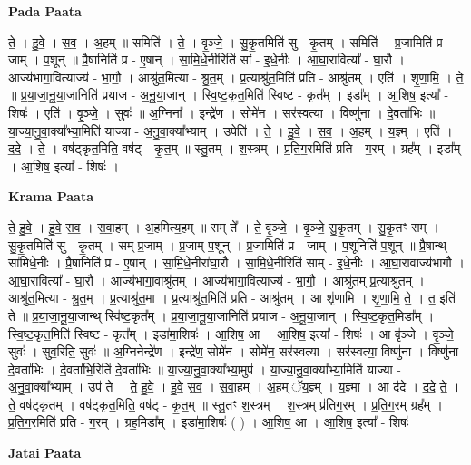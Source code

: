 \documentclass[17pt]{extarticle}
\begin{document}
\textbf{Pada Paata} \newline

ते॒ । हु॒वे॒ । स॒व॒ । अ॒हम् ॥ समिति॑ । ते॒ । वृ॒ञ्जे॒ । सु॒कृ॒तमिति॑ सु - कृ॒तम् । समिति॑ । प्र॒जामिति॑ प्र - जाम् । प॒शून् ॥ प्रै॒षानिति॑ प्र - ए॒षान् । सा॒मि॒धे॒नीरिति॑ सां - इ॒धे॒नीः । आ॒घा॒रावित्या᳚ - घा॒रौ । आज्य॑भागा॒वित्याज्य॑ - भा॒गौ॒ । आश्रु॑त॒मित्या - श्रु॒त॒म् । प्र॒त्याश्रु॑त॒मिति॑ प्रति - आश्रु॑तम् । एति॑ । शृ॒णा॒मि॒ । ते॒ ॥ प्र॒या॒जा॒नू॒या॒जानिति॑ प्रयाज - अ॒नू॒या॒जान् । स्वि॒ष्ट॒कृत॒मिति॑ स्विष्ट - कृत᳚म् । इडा᳚म् । आ॒शिष॒ इत्या᳚ - शिषः॑ । एति॑ । वृ॒ञ्जे॒ । सुवः॑ ॥ अ॒ग्निना᳚ । इन्द्रे॑ण । सोमे॑न । सर॑स्वत्या । विष्णु॑ना । दे॒वता॑भिः ॥ या॒ज्या॒नु॒वा॒क्या᳚भ्या॒मिति॑ याज्या - अ॒नु॒वा॒क्या᳚भ्याम् । उपेति॑ । ते॒ । हु॒वे॒ । स॒व॒ । अ॒हम् । य॒ज्ञ्म् । एति॑ । द॒दे॒ । ते॒ । वष॑ट्कृत॒मिति॒ वष॑ट् - कृ॒त॒म् ॥ स्तु॒तम् । श॒स्त्रम् । प्र॒ति॒ग॒रमिति॑ प्रति - ग॒रम् । ग्रह᳚म् । इडा᳚म् । आ॒शिष॒ इत्या᳚ - शिषः॑ ।  \newline


\textbf{Krama Paata} \newline

ते॒ हु॒वे॒ । हु॒वे॒ स॒व॒ । स॒वा॒हम् । अ॒हमित्य॒हम् ॥ सम् ते᳚ । ते॒ वृ॒ञ्जे॒ । वृ॒ञ्जे॒ सु॒कृ॒तम् । सु॒कृ॒तꣳ सम् । सु॒कृ॒तमिति॑ सु - कृ॒तम् । सम् प्र॒जाम् । प्र॒जाम् प॒शून् । प्र॒जामिति॑ प्र - जाम् । प॒शूनिति॑ प॒शून् ॥ प्रै॒षान्थ् सा॑मिधे॒नीः । प्रै॒षानिति॑ प्र - ए॒षान् । सा॒मि॒धे॒नीरा॑घा॒रौ । सा॒मि॒धे॒नीरिति॑ साम् - इ॒धे॒नीः । आ॒घा॒रावाज्य॑भागौ । आ॒घा॒रावित्या᳚ - घा॒रौ । आज्य॑भागा॒वाश्रु॑तम् । आज्य॑भागा॒वित्याज्य॑ - भा॒गौ॒ । आश्रु॑तम् प्र॒त्याश्रु॑तम् । आश्रु॑त॒मित्या - श्रु॒त॒म् । प्र॒त्याश्रु॑त॒मा । प्र॒त्याश्रु॑त॒मिति॑ प्रति - आश्रु॑तम् । आ शृ॑णामि । शृ॒णा॒मि॒ ते॒ । त॒ इति॑ ते ॥ प्र॒या॒जा॒नू॒या॒जान्थ् स्वि॑ष्ट॒कृत᳚म् । प्र॒या॒जा॒नू॒या॒जानिति॑ प्रयाज - अ॒नू॒या॒जान् । स्वि॒ष्ट॒कृत॒मिडा᳚म् । स्वि॒ष्ट॒कृत॒मिति॑ स्विष्ट - कृत᳚म् । इडा॑मा॒शिषः॑ । आ॒शिष॒ आ । आ॒शिष॒ इत्या᳚ - शिषः॑ । आ वृ॑ञ्जे । वृ॒ञ्जे॒ सुवः॑ । सुव॒रिति॒ सुवः॑ ॥ अ॒ग्निनेन्द्रे॑ण । इन्द्रे॑ण॒ सोमे॑न । सोमे॑न॒ सर॑स्वत्या । सर॑स्वत्या॒ विष्णु॑ना । विष्णु॑ना दे॒वता॑भिः । दे॒वता॑भि॒रिति॑ दे॒वता॑भिः ॥ या॒ज्या॒नु॒वा॒क्या᳚भ्या॒मुप॑ । या॒ज्या॒नु॒वा॒क्या᳚भ्या॒मिति॑ याज्या - अ॒नु॒वा॒क्या᳚भ्याम् । उप॑ ते । ते॒ हु॒वे॒ । हु॒वे॒ स॒व॒ । स॒वा॒हम् । अ॒हम् ॅय॒ज्ञ्म् । य॒ज्ञ्मा । आ द॑दे । द॒दे॒ ते॒ । ते॒ वष॑ट्कृतम् । वष॑ट्कृत॒मिति॒ वष॑ट् - कृ॒त॒म् ॥ स्तु॒तꣳ श॒स्त्रम् । श॒स्त्रम् प्र॑तिग॒रम् । प्र॒ति॒ग॒रम् ग्रह᳚म् । प्र॒ति॒ग॒रमिति॑ प्रति - ग॒रम् । ग्रह॒मिडा᳚म् । इडा॑मा॒शिषः॑ ( ) । आ॒शिष॒ आ । आ॒शिष॒ इत्या᳚ - शिषः॑ \newline

\textbf{Jatai Paata} \newline
\end{document}
